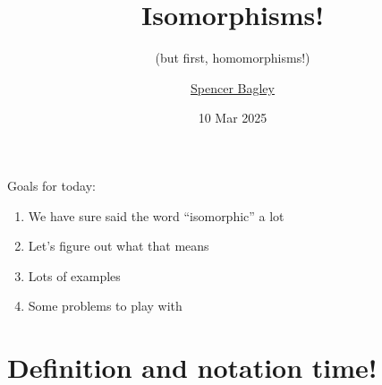 \documentclass[8pt, handout]{beamer}
\title[Homomorphisms!]{Isomorphisms!}
\subtitle{(but first, homomorphisms!)}
\author[\href{mailto:sbagley@westminsteru.edu}{S. Bagley}]
       {\href{mailto:sbagley@westminsteru.edu}{Spencer Bagley}}
\institute[Westminster] { 
  \normalsize With many thanks to Matthew Macauley, \\
  \url{http://www.math.clemson.edu/~macaule/}}
\date[10 Mar 2025]{10 Mar 2025}
\begin{document}
\frame{\titlepage}


\begin{frame}{Goals for today:}
  \begin{enumerate}
    \item We have sure said the word ``isomorphic'' a lot
    \item Let's figure out what that  means
    \item Lots of examples
    \item Some problems to play with
  \end{enumerate}
\end{frame}


\section{Definition and notation time!}
\end{document}
